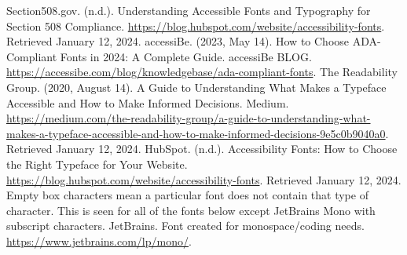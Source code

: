 
\begin{thebibliography}{99}
 Section508.gov. (n.d.). Understanding Accessible Fonts and Typography for Section 508 Compliance. \url{https://blog.hubspot.com/website/accessibility-fonts}. Retrieved January 12, 2024.
 accessiBe. (2023, May 14). How to Choose ADA-Compliant Fonts in 2024: A Complete Guide. accessiBe BLOG. \url{https://accessibe.com/blog/knowledgebase/ada-compliant-fonts}.
 The Readability Group. (2020, August 14). A Guide to Understanding What Makes a Typeface Accessible and How to Make Informed Decisions. Medium. \url{https://medium.com/the-readability-group/a-guide-to-understanding-what-makes-a-typeface-accessible-and-how-to-make-informed-decisions-9e5c0b9040a0}. Retrieved January 12, 2024.
 HubSpot. (n.d.). Accessibility Fonts: How to Choose the Right Typeface for Your Website. \url{https://blog.hubspot.com/website/accessibility-fonts}. Retrieved January 12, 2024.
 Empty box characters mean a particular font does not contain that type of character. This is seen for all of the fonts below except JetBrains Mono with subscript characters.
 JetBrains. Font created for monospace/coding needs. \url{https://www.jetbrains.com/lp/mono/}.
\end{thebibliography}
